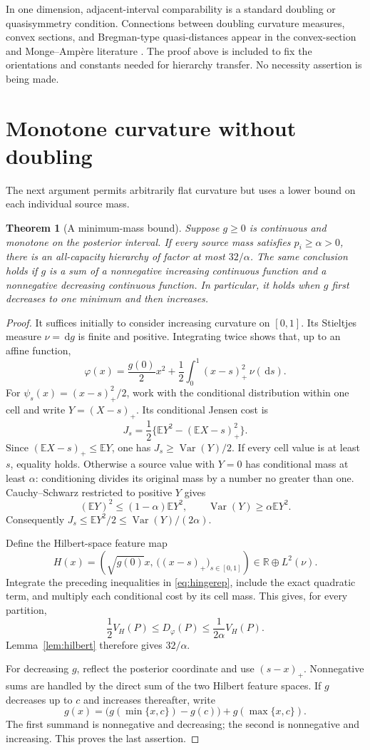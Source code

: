 \documentclass[11pt]{article}
\newtheorem{theorem}{Theorem}[section]
\theoremstyle{definition}\newtheorem{definition}[theorem]{Definition}
\theoremstyle{remark}\newtheorem{remark}[theorem]{Remark}
\newcommand{\ph}{\varphi}
\newcommand{\D}{D_{\ph}}
\newcommand{\E}{\mathbb E}
\newcommand{\Var}{\operatorname{Var}}
\newcommand{\R}{\mathbb R}
\newcommand{\rd}{\,\mathrm d}
\begin{document}
In one dimension, adjacent-interval comparability is a standard doubling or quasisymmetry condition. Connections between doubling curvature measures, convex sections, and Bregman-type quasi-distances appear in the convex-section and Monge--Amp\`ere literature \cite{calogero,maldonado}. The proof above is included to fix the orientations and constants needed for hierarchy transfer. No necessity assertion is being made.

\section{Monotone curvature without doubling}
\label{sec:monotone}
The next argument permits arbitrarily flat curvature but uses a lower bound on each individual source mass.
\begin{theorem}[A minimum-mass bound]
\label{thm:monotone}
Suppose $g\ge0$ is continuous and monotone on the posterior interval. If every source mass satisfies $p_i\ge\alpha>0$, there is an all-capacity hierarchy of factor at most $32/\alpha$. The same conclusion holds if $g$ is a sum of a nonnegative increasing continuous function and a nonnegative decreasing continuous function. In particular, it holds when $g$ first decreases to one minimum and then increases.
\end{theorem}
\begin{proof}
It suffices initially to consider increasing curvature on $[0,1]$. Its Stieltjes measure $\nu=\rd g$ is finite and positive. Integrating twice shows that, up to an affine function,
\begin{equation}
\ph(x)=\frac{g(0)}2x^2+\frac12\int_0^1(x-s)_+^2\,\nu(\rd s).
\label{eq:hingerep}
\end{equation}
For $\psi_s(x)=(x-s)_+^2/2$, work with the conditional distribution within one cell and write $Y=(X-s)_+$. Its conditional Jensen cost is
\[
J_s=\frac12\{\E Y^2-(\E X-s)_+^2\}.
\]
Since $(\E X-s)_+\le\E Y$, one has $J_s\ge\Var(Y)/2$. If every cell value is at least $s$, equality holds. Otherwise a source value with $Y=0$ has conditional mass at least $\alpha$: conditioning divides its original mass by a number no greater than one. Cauchy--Schwarz restricted to positive $Y$ gives
\[
(\E Y)^2\le(1-\alpha)\E Y^2,
\qquad
\Var(Y)\ge\alpha\E Y^2.
\]
Consequently $J_s\le\E Y^2/2\le\Var(Y)/(2\alpha)$.

Define the Hilbert-space feature map
\[
H(x)=\left(\sqrt{g(0)}x,\,\bigl((x-s)_+\bigr)_{s\in[0,1]}\right)
\in\R\oplus L^2(\nu).
\]
Integrate the preceding inequalities in \eqref{eq:hingerep}, include the exact quadratic term, and multiply each conditional cost by its cell mass. This gives, for every partition,
\[
\frac12 V_H(P)\le\D(P)\le\frac{1}{2\alpha}V_H(P).
\]
Lemma~\ref{lem:hilbert} therefore gives $32/\alpha$.

For decreasing $g$, reflect the posterior coordinate and use $(s-x)_+$. Nonnegative sums are handled by the direct sum of the two Hilbert feature spaces. If $g$ decreases up to $c$ and increases thereafter, write
\[
g(x)=\bigl(g(\min\{x,c\})-g(c)\bigr)+g(\max\{x,c\}).
\]
The first summand is nonnegative and decreasing; the second is nonnegative and increasing. This proves the last assertion.
\end{proof}
\end{document}
